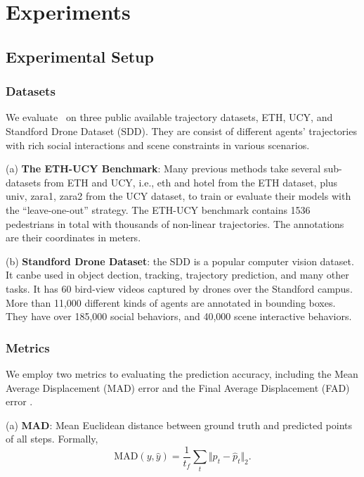\documentclass[../paper.tex]{subfiles}
\begin{document}
    
\section{Experiments}

\subsection{Experimental Setup}

\subsubsection{Datasets}
We evaluate \MODEL~on three public available trajectory datasets, ETH\cite{youWillNeverWalkAlone}, UCY\cite{2007Crowds}, and Standford Drone Dataset (SDD)\cite{learningSocialEtiquette}.
They are consist of different agents' trajectories with rich social interactions and scene constraints in various scenarios.

(a) \textbf{The ETH-UCY Benchmark}:
Many previous methods \cite{socialLSTM,socialGAN,sophie} take several sub-datasets from ETH and UCY, i.e., eth and hotel from the ETH dataset, plus univ, zara1, zara2 from the UCY dataset, to train or evaluate their models with the ``leave-one-out'' strategy.
The ETH-UCY benchmark contains 1536 pedestrians in total with thousands of non-linear trajectories.
The annotations are their coordinates in meters.

(b) \textbf{Standford Drone Dataset}:
the SDD\cite{learningSocialEtiquette} is a popular computer vision dataset.
It canbe used in object dection, tracking, trajectory prediction, and many other tasks.
It has 60 bird-view videos captured by drones over the Standford campus.
More than 11,000 different kinds of agents are annotated in bounding boxes.
They have over 185,000 social behaviors, and 40,000 scene interactive behaviors.


\subsubsection{Metrics}
We employ two metrics to evaluating the prediction accuracy, including the Mean Average Displacement (MAD) error and the Final Average Displacement (FAD) error \cite{youWillNeverWalkAlone}.

(a) \textbf{MAD}:
Mean Euclidean distance between ground truth and predicted points of all steps.
Formally,
\begin{equation}
    \mbox{MAD}(y, \hat{y}) = \frac{1}{t_f} \sum_{t} \Vert p_t - \hat{p}_t \Vert_2.
\end{equation}
\end{document}
